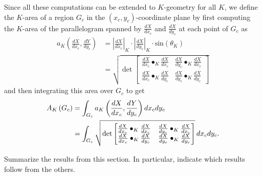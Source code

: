 \documentclass{ximera}
\begin{document}
Since all these computations can be extended to $K$-geometry for all
$K$, we define the $K$-area of a region $G_{c}$ in the $\left(
x_{c},y_{c}\right) $-coordinate plane by first computing the $K$-area
of the parallelogram spanned by $\frac{dX}{dx_{c}}$ and
$\frac{dX}{dy_{c}}$ at each point of $G_{c}$ as%
\begin{align*}
a_{K}\left(  \frac{dX}{dx_{c}},\frac{dY}{dy_{c}}\right) &=\left\vert
\frac{dX}{dx_{c}}\right\vert _{K}\cdot\left\vert \frac{dX}{dy_{c}}\right\vert
_{K}\cdot\mathrm{sin}\left(  \theta_{K}\right) \\
&  =\sqrt{\det
\begin{bmatrix}
\frac{dX}{dx_{c}}\bullet_{K}\frac{dX}{dx_{c}} & \frac{dX}{dy_{c}}\bullet
_{K}\frac{dX}{dx_{c}}\\
\frac{dX}{dx_{c}}\bullet_{K}\frac{dX}{dy_{c}} & \frac{dX}{dy_{c}}\bullet
_{K}\frac{dX}{dy_{c}}%
\end{bmatrix}}%
\end{align*}
and then integrating this area over $G_{c}$ to get%
\begin{align*}
A_{K}\left(  G_{c}\right) &=
\int_{G_{c}}
a_{K}\left(  \frac{dX}{dx_{c}},\frac{dY}{dy_{c}}\right)  dx_{c}dy_{c}\\
&  =%
\int_{G_{c}}
\sqrt{\det
\begin{bmatrix}
\frac{dX}{dx_{c}}\bullet_{K}\frac{dX}{dx_{c}} & \frac{dX}{dy_{c}}\bullet
_{K}\frac{dX}{dx_{c}}\\
\frac{dX}{dx_{c}}\bullet_{K}\frac{dX}{dy_{c}} & \frac{dX}{dy_{c}}\bullet
_{K}\frac{dX}{dy_{c}}%
\end{bmatrix}}\d x_{c}dy_{c}.
\end{align*}



\begin{problem}
Summarize the results from this section. In particular, indicate which
results follow from the others.
\begin{freeResponse}
\end{freeResponse}
\end{problem}
\end{document}
